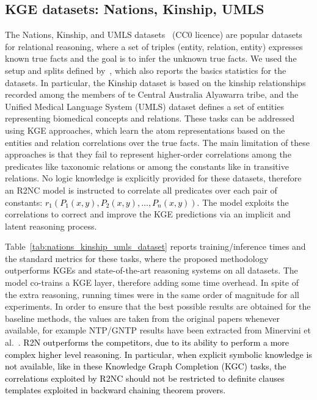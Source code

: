 \documentclass[journal]{IEEEtran}
\newcommand{\ar}[1]{\textcolor{black}{#1}}
\begin{document}
\subsection{KGE datasets: Nations, Kinship, UMLS}
\label{sec:kgc}
The Nations, Kinship, and UMLS datasets~\cite{kok2007statistical} (CC0 licence) are popular datasets for relational reasoning, where a set of triples (entity, relation, entity) expresses known true facts and the goal is to infer the unknown true facts. We used the setup and splits defined by~\cite{minervini2020learning}, which also reports the basics statistics for the datasets.
In particular, the Kinship dataset is based on the kinship relationships recorded among the members of te Central Australia Alyawarra tribe, and the Unified Medical Language System (UMLS) dataset defines a set of entities representing biomedical concepts and relations.
These tasks can be addressed using KGE approaches, which learn the atom representations based on the entities and relation correlations over the true facts.
The main limitation of these approaches is that they fail to represent higher-order correlations among the predicates like taxonomic relations or among the constants like in transitive relations.
No logic knowledge is explicitly provided for these datasets, therefore an R2NC model is instructed to correlate all predicates over each pair of constants: \ar{$r_1(P_1(x,y), P_2(x,y), \ldots, P_n(x,y))$}.
The model exploits the correlations to correct and improve the KGE predictions via an implicit and latent reasoning process.


Table~\ref{tab:nations_kinship_umls_dataset} reports training/inference times and the standard metrics for these tasks, where the proposed methodology outperforms KGEs and state-of-the-art reasoning systems on all datasets.
The model co-trains a KGE layer, therefore adding some time overhead. In spite of the extra reasoning, running times were in the same order of magnitude for all experiments.
In order to ensure that the best possible results are obtained for the baseline methods, the values are taken from the original papers whenever available, for example NTP/GNTP results have been extracted from Minervini et al.~\cite{minervini2020learning}. \ar{R2N outperforms the competitors, due to its ability to perform a more complex higher level reasoning. In particular, when explicit symbolic knowledge is not available, like in these Knowledge Graph Completion (KGC) tasks, the correlations exploited by R2NC should not be restricted to definite clauses templates exploited in backward chaining theorem provers.}
\end{document}
